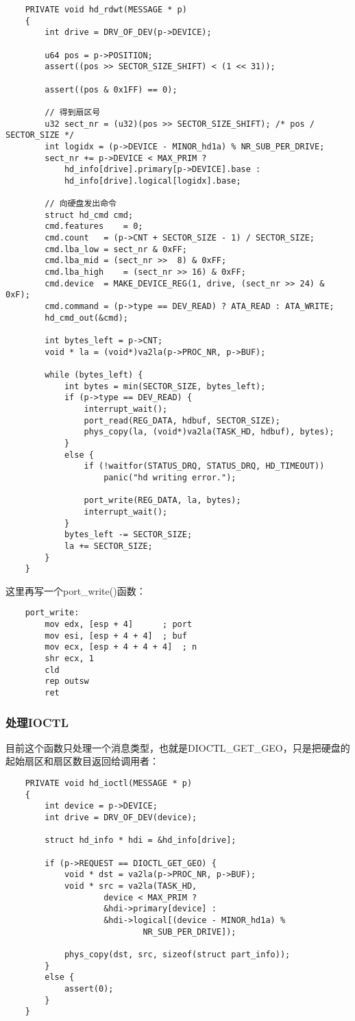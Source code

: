 \documentclass[a4paper,left=2.5cm,right=2.5cm,11pt]{article}
\begin{document}
	\begin{lstlisting}
	PRIVATE void hd_rdwt(MESSAGE * p)
	{
		int drive = DRV_OF_DEV(p->DEVICE);

		u64 pos = p->POSITION;
		assert((pos >> SECTOR_SIZE_SHIFT) < (1 << 31));

		assert((pos & 0x1FF) == 0);

		// 得到扇区号
		u32 sect_nr = (u32)(pos >> SECTOR_SIZE_SHIFT); /* pos / SECTOR_SIZE */
		int logidx = (p->DEVICE - MINOR_hd1a) % NR_SUB_PER_DRIVE;
		sect_nr += p->DEVICE < MAX_PRIM ?
			hd_info[drive].primary[p->DEVICE].base :
			hd_info[drive].logical[logidx].base;
		
		// 向硬盘发出命令
		struct hd_cmd cmd;
		cmd.features	= 0;
		cmd.count	= (p->CNT + SECTOR_SIZE - 1) / SECTOR_SIZE;
		cmd.lba_low	= sect_nr & 0xFF;
		cmd.lba_mid	= (sect_nr >>  8) & 0xFF;
		cmd.lba_high	= (sect_nr >> 16) & 0xFF;
		cmd.device	= MAKE_DEVICE_REG(1, drive, (sect_nr >> 24) & 0xF);
		cmd.command	= (p->type == DEV_READ) ? ATA_READ : ATA_WRITE;
		hd_cmd_out(&cmd);

		int bytes_left = p->CNT;
		void * la = (void*)va2la(p->PROC_NR, p->BUF);

		while (bytes_left) {
			int bytes = min(SECTOR_SIZE, bytes_left);
			if (p->type == DEV_READ) {
				interrupt_wait();
				port_read(REG_DATA, hdbuf, SECTOR_SIZE);
				phys_copy(la, (void*)va2la(TASK_HD, hdbuf), bytes);
			}
			else {
				if (!waitfor(STATUS_DRQ, STATUS_DRQ, HD_TIMEOUT))
					panic("hd writing error.");

				port_write(REG_DATA, la, bytes);
				interrupt_wait();
			}
			bytes_left -= SECTOR_SIZE;
			la += SECTOR_SIZE;
		}
	}
	\end{lstlisting}

	这里再写一个port\_write()函数：
	\begin{lstlisting}
	port_write:
		mov	edx, [esp + 4]		; port
		mov	esi, [esp + 4 + 4]	; buf
		mov	ecx, [esp + 4 + 4 + 4]	; n
		shr	ecx, 1
		cld
		rep	outsw
		ret
	\end{lstlisting}

\subsubsection{处理IOCTL}
	目前这个函数只处理一个消息类型，也就是DIOCTL\_GET\_GEO，只是把硬盘的起始扇区和扇区数目返回给调用者：
	\begin{lstlisting}
	PRIVATE void hd_ioctl(MESSAGE * p)
	{
		int device = p->DEVICE;
		int drive = DRV_OF_DEV(device);

		struct hd_info * hdi = &hd_info[drive];

		if (p->REQUEST == DIOCTL_GET_GEO) {
			void * dst = va2la(p->PROC_NR, p->BUF);
			void * src = va2la(TASK_HD,
					device < MAX_PRIM ?
					&hdi->primary[device] :
					&hdi->logical[(device - MINOR_hd1a) %
							NR_SUB_PER_DRIVE]);

			phys_copy(dst, src, sizeof(struct part_info));
		}
		else {
			assert(0);
		}
	}
	\end{lstlisting}
\end{document}
